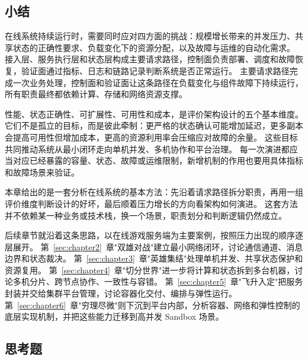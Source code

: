 \subsection{小结}\label{sec1:summary}

在线系统持续运行时，需要同时应对四方面的挑战：规模增长带来的并发压力、共享状态的正确性要求、负载变化下的资源分配，以及故障与运维的自动化需求。
接入层、服务执行层和状态层构成主要请求路径，控制面负责部署、调度和故障恢复，验证面通过指标、日志和链路记录判断系统是否正常运行。
主要请求路径完成一次业务处理，控制面和验证面让这条路径在负载变化与组件故障下持续运行，所有职责最终都依赖计算、存储和网络资源支撑。

性能、状态正确性、可扩展性、可用性和成本，是评价架构设计的五个基本维度。
它们不是孤立的目标，而是彼此牵制：更严格的状态确认可能增加延迟，更多副本会提高可用性但增加成本，更高的资源利用率会压缩应对故障的余量。
这些目标共同推动系统从最小闭环走向单机并发、多机协作和平台治理。
每一次演进都应当对应已经暴露的容量、状态、故障或运维限制，新增机制的作用也要用具体指标和故障场景来验证。

本章给出的是一套分析在线系统的基本方法：先沿着请求路径拆分职责，再用一组评价维度判断设计的好坏，最后顺着压力增长的方向看架构如何演进。
这套方法并不依赖某一种业务或技术栈，换一个场景，职责划分和判断逻辑仍然成立。

后续章节就沿着这条思路，以在线游戏服务端为主要案例，按照压力出现的顺序逐层展开。
第~\ref{sec:chapter2}~章"双雄对战"建立最小网络闭环，讨论通信通道、消息边界和状态裁决。
第~\ref{sec:chapter3}~章"英雄集结"处理单机并发、共享状态保护和资源复用。
第~\ref{sec:chapter4}~章"切分世界"进一步将计算和状态拆到多台机器，讨论多机分片、跨节点协作、一致性与容错。
第~\ref{sec:chapter5}~章"飞升入定"把服务封装并交给集群平台管理，讨论容器化交付、编排与弹性运行。
第~\ref{sec:chapter6}~章"穷理尽微"则下沉到平台内部，分析容器、网络和弹性控制的底层实现机制，并把这些能力迁移到高并发 Sandbox 场景。

\subsection{思考题}

